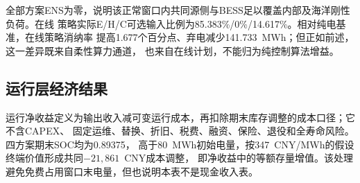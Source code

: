 \begin{table}[htbp]
\centering
\caption{正常典型48 h四方案产品投入与交付结果}
\label{tab:c5-typical-product}
\end{table}

全部方案ENS为零，说明该正常窗口内共同源侧与BESS足以覆盖内部及海洋刚性负荷。在线
策略实际E/H/C可选输入比例为85.383\%/0\%/14.617\%。相对纯电基准，在线策略消纳率
提高1.677个百分点、弃电减少141.733~MWh；但正如前述，这一差异既来自柔性算力通道，
也来自在线计划，不能归为纯控制算法增益。

\subsection{运行层经济结果}

\begin{table}[htbp]
\centering
\caption{正常典型48 h四方案运行层经济分账}
\label{tab:c5-typical-economics}
\end{table}

运行净收益定义为输出收入减可变运行成本，再扣除期末库存调整的成本口径；它不含CAPEX、
固定运维、替换、折旧、税费、融资、保险、退役和全寿命风险。四方案期末SOC均为0.89375，
高于80~MWh初始电量，按347~CNY/MWh的假设终端价值形成共同$-21,861$~CNY成本调整，
即净收益中的等额存量增值。该处理避免免费占用窗口末电量，但也说明本表不是现金收入表。

